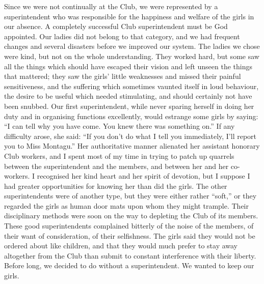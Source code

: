 Since we were not continually at the Club, we were
represented by a superintendent who was responsible for
the happiness and welfare of the girls in our absence. A
completely successful Club superintendent must be God
appointed. Our ladies did not belong to that category,
and we had frequent changes and several disasters before
we improved our system. The ladies we chose were kind,
but not on the whole understanding. They worked hard,
but some saw all the things which should have escaped
their vision and left unseen the things that mattered;
they saw the girls’ little weaknesses and missed their painful
sensitiveness, and the suffering which sometimes
vaunted itself in loud behaviour, the desire to be useful
which needed stimulating, and should certainly not have
been snubbed. Our first superintendent, while never
sparing herself in doing her duty and in organising functions
excellently, would estrange some girls by saying:
“I can tell why you have come. You knew there was
something on.” If any difficulty arose, she said: “If
you don’t do what I tell you immediately, I'll report you
to Miss Montagu.” Her authoritative manner alienated
her assistant honorary Club workers, and I spent most
of my time in trying to patch up quarrels between the
superintendent and the members, and between her and
her co-workers. I recognised her kind heart and her spirit
of devotion, but I suppose I had greater opportunities for
knowing her than did the girls. The other superintendents
were of another type, but they were either rather “soft,”
or they regarded the girls as human door mats upon
whom they might trample. Their disciplinary methods
were soon on the way to depleting the Club of its members.
These good superintendents complained bitterly of
the noise of the members, of their want of consideration,
of their selfishness. The girls said they would not be
ordered about like children, and that they would much
prefer to stay away altogether from the Club than
submit to constant interference with their liberty. Before
long, we decided to do without a superintendent. We
wanted to keep our girls.


